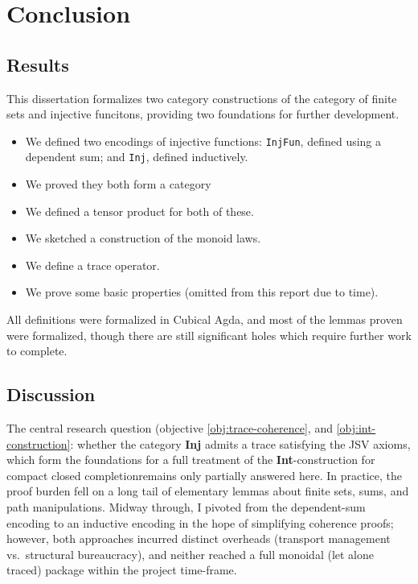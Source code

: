 \chapter{Conclusion}\label{conclusion}

\section{Results}
This dissertation formalizes two category constructions of the
category of finite sets and injective funcitons, providing two
foundations for further development.

\begin{itemize}
  \item We defined two encodings of injective functions:
    \texttt{InjFun}, defined using a dependent sum; and \texttt{Inj},
    defined inductively.
  \item We proved they both form a category
  \item We defined a tensor product for both of these.
  \item We sketched a construction of the monoid laws.
  \item We define a trace operator.
  \item We prove some basic properties (omitted from this report due to time).
\end{itemize}

All definitions were formalized in Cubical Agda, and most of the
lemmas proven were formalized, though there are still significant
holes which require further work to complete.

\section{Discussion}
The central research question (objective \ref{obj:trace-coherence},
and \ref{obj:int-construction}: whether the category \textbf{Inj}
admits a trace satisfying the JSV axioms, which form the foundations
for a full treatment of the \textbf{Int}-construction for compact
closed completionremains only partially answered here. In practice,
the proof burden fell on a long tail of elementary lemmas about finite
sets, sums, and path manipulations. Midway through, I pivoted from the
dependent-sum encoding to an inductive encoding in the hope of
simplifying coherence proofs; however, both approaches incurred
distinct overheads (transport management vs.\ structural bureaucracy),
and neither reached a full monoidal (let alone traced) package within
the project time-frame.

